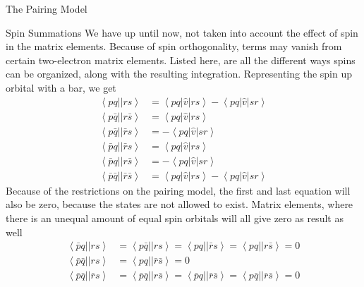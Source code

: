 \documentclass[twoside,english]{uiofysmaster}
\begin{document}
\begin{chapter}{The Pairing Model}
 	\begin{section}{Spin Summations}
 		We have up until now, not taken into account the effect of spin in the matrix elements. Because of spin orthogonality, terms may vanish from certain two-electron matrix elements. Listed here, are all the different ways spins can be organized, along with the resulting integration. Representing the spin up orbital with a bar, we get \cite{ShavittAndBartlett}
 		\begin{align}
 			\left< pq || rs \right> &= \left< pq | \hat v | rs \right> - \left< pq | \hat v | sr \right> \\
 			\left< p\bar q || r\bar s \right> &= \left<pq | \hat v | rs \right> \\
 			\left< p \bar q|| \bar r s \right> &= - \left<pq | \hat v | sr \right> \\
 			\left< \bar p q|| \bar r s\right> &= \left< pq | \hat v | rs \right> \\
 			\left< \bar p q|| r \bar s \right> &= - \left< pq | \hat v | sr \right> \\
 			\left< \bar p \bar q || \bar r \bar s \right> &= \left< pq | \hat v | rs \right> - \left< pq | \hat v | sr \right> 
 		\end{align}
 		Because of the restrictions on the pairing model, the first and last equation will also be zero, because the states are not allowed to exist. Matrix elements, where there is an unequal amount of equal spin orbitals will all give zero as result as well
 		\begin{align}
 			\left< \bar p q || rs \right> &= \left< p \bar q || rs \right> = \left< pq || \bar r s \right> = \left< pq || r \bar s \right> = 0 \\
 			\left< \bar p \bar q || rs \right> &= \left< pq || \bar r \bar s \right>  = 0 \\
 			\left< \bar p \bar q || \bar r s \right> &= \left< \bar p \bar q || r \bar s \right> = \left< \bar p q || \bar r \bar s \right> = \left< p \bar q || \bar r \bar s \right> = 0
 		\end{align} 


 	\end{section}

\end{chapter}
\end{document}
